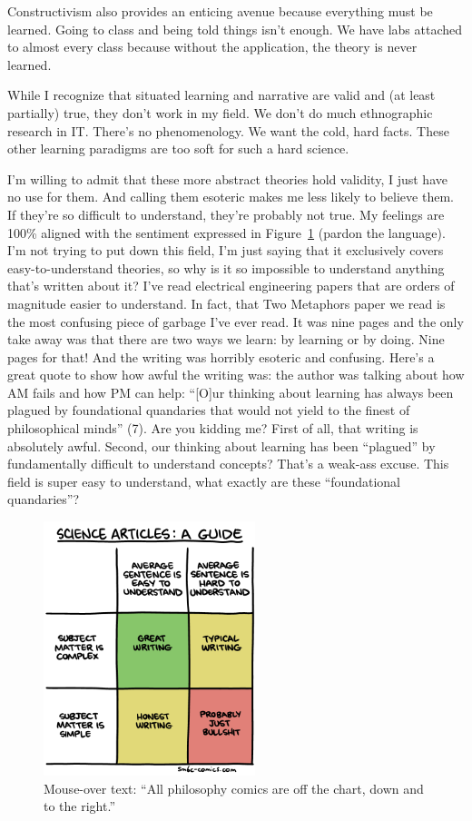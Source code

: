 \documentclass[man,natbib]{apa6}
\begin{document}
Constructivism also provides an enticing avenue because everything must be learned. Going to class and being told things isn't enough. We have labs attached to almost every class because without the application, the theory is never learned.

While I recognize that situated learning and narrative are valid and (at least partially) true, they don't work in my field. We don't do much ethnographic research in IT. There's no phenomenology. We want the cold, hard facts. These other learning paradigms are too soft for such a hard science.

I'm willing to admit that these more abstract theories hold validity, I just have no use for them.
And calling them esoteric makes me less likely to believe them. If they're so difficult to understand, they're probably not true. My feelings are 100\% aligned with the sentiment expressed in Figure~\ref{fig:science-articles-writing} (pardon the language). I'm not trying to put down this field, I'm just saying that it exclusively covers easy-to-understand theories, so why is it so impossible to understand anything that's written about it? I've read electrical engineering papers that are orders of magnitude easier to understand. In fact, that Two Metaphors \citep{sfard1998two} paper we read is the most confusing piece of garbage I've ever read. It was nine pages and the only take away was that there are two ways we learn: by learning or by doing. Nine pages for that! And the writing was horribly esoteric and confusing.
Here's a great quote to show how awful the writing was: the author was talking about how AM fails and how PM can help: ``[O]ur thinking about learning has always been plagued by foundational quandaries that would not yield to the finest of philosophical minds'' (7). Are you kidding me? First of all, that writing is absolutely awful. Second, our thinking about learning has been ``plagued'' by fundamentally difficult to understand concepts? That's a weak-ass excuse. This field is super easy to understand, what exactly are these ``foundational quandaries''?
\begin{figure}[h]
    \centering
    \includegraphics[width=0.55\textwidth]{science-articles-writing}
    \caption{Mouse-over text: ``All philosophy comics are off the chart, down and to the right.''}
    \label{fig:science-articles-writing}
\end{figure}
\end{document}
